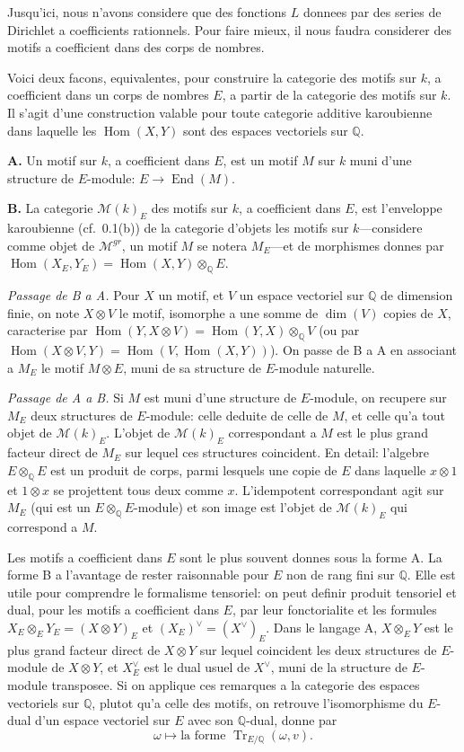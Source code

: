 \documentclass[12pt,a4paper]{article}
\theoremstyle{plain}
\theoremstyle{definition}
\theoremstyle{remark}
\DeclareMathOperator{\Hom}{Hom}
\DeclareMathOperator{\End}{End}
\DeclareMathOperator{\Tr}{Tr}
\newcommand{\Q}{\mathbb{Q}}
\begin{document}
Jusqu'ici, nous n'avons considere que des fonctions $L$ donnees par des series de
Dirichlet a coefficients rationnels. Pour faire mieux, il nous faudra considerer des
motifs a coefficient dans des corps de nombres.

Voici deux facons, equivalentes, pour construire la categorie des motifs sur $k$,
a coefficient dans un corps de nombres $E$, a partir de la categorie des motifs sur $k$.
Il s'agit d'une construction valable pour toute categorie additive karoubienne
dans laquelle les $\Hom(X, Y)$ sont des espaces vectoriels sur $\Q$.

\textbf{A.} Un motif sur $k$, a coefficient dans $E$, est un motif $M$ sur $k$ muni d'une structure
de $E$-module: $E \to \End(M)$.

\textbf{B.} La categorie $\mathcal{M}(k)_E$ des motifs sur $k$, a coefficient dans $E$, est l'enveloppe
karoubienne (cf.~0.1(b)) de la categorie d'objets les motifs sur $k$---considere
comme objet de $\mathcal{M}^{gr}$, un motif $M$ se notera $M_E$---et de morphismes donnes par
$\Hom(X_E, Y_E) = \Hom(X, Y) \otimes_\Q E$.

\textit{Passage de B a A.} Pour $X$ un motif, et $V$ un espace vectoriel sur $\Q$ de dimension
finie, on note $X \otimes V$ le motif, isomorphe a une somme de $\dim(V)$ copies de $X$,
caracterise par $\Hom(Y, X \otimes V) = \Hom(Y, X) \otimes_\Q V$ (ou par
$\Hom(X \otimes V, Y) = \Hom(V, \Hom(X, Y))$). On passe de B a A en associant a
$M_E$ le motif $M \otimes E$, muni de sa structure de $E$-module naturelle.

\textit{Passage de A a B.} Si $M$ est muni d'une structure de $E$-module, on recupere sur
$M_E$ deux structures de $E$-module: celle deduite de celle de $M$, et celle qu'a tout
objet de $\mathcal{M}(k)_E$. L'objet de $\mathcal{M}(k)_E$ correspondant a $M$ est le plus grand facteur
direct de $M_E$ sur lequel ces structures coincident. En detail: l'algebre $E \otimes_\Q E$ est un
produit de corps, parmi lesquels une copie de $E$ dans laquelle $x \otimes 1$ et $1 \otimes x$ se
projettent tous deux comme $x$. L'idempotent correspondant agit sur $M_E$ (qui est
un $E \otimes_\Q E$-module) et son image est l'objet de $\mathcal{M}(k)_E$ qui correspond a $M$.

Les motifs a coefficient dans $E$ sont le plus souvent donnes sous la forme A. La
forme B a l'avantage de rester raisonnable pour $E$ non de rang fini sur $\Q$. Elle est
utile pour comprendre le formalisme tensoriel: on peut definir produit tensoriel et
dual, pour les motifs a coefficient dans $E$, par leur fonctorialite et les formules
$X_E \otimes_E Y_E = (X \otimes Y)_E$ et $(X_E)^\vee = (X^\vee)_E$. Dans le langage A, $X \otimes_E Y$
est le plus grand facteur direct de $X \otimes Y$ sur lequel coincident les deux structures de
$E$-module de $X \otimes Y$, et $X^\vee_E$ est le dual usuel de $X^\vee$, muni de la structure de
$E$-module transposee. Si on applique ces remarques a la categorie des espaces vectoriels
sur $\Q$, plutot qu'a celle des motifs, on retrouve l'isomorphisme du $E$-dual d'un espace
vectoriel sur $E$ avec son $\Q$-dual, donne par
\[
\omega \mapsto \text{la forme } \Tr_{E/\Q}(\omega, v).
\]
\end{document}
